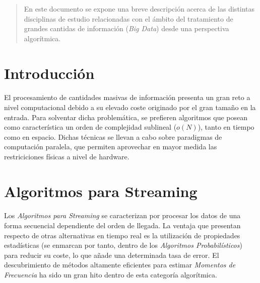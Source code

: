 \documentclass[a4paper]{article}
\begin{document}
  \maketitle %



  	\begin{abstract}
  		\noindent En este documento se expone una breve descripción acerca de las distintas disciplinas de estudio relacionadas con el ámbito del tratamiento de grandes cantidas de información (\emph{Big Data}) desde una perspectiva algorítmica.
  	\end{abstract}


  \section{Introducción}

    \paragraph{}
    El procesamiento de cantidades masivas de información presenta un gran reto a nivel computacional debido a su elevado coste originado por el gran tamaño en la entrada. Para solventar dicha problemática, se prefieren algoritmos que posean como característica un orden de complejidad sublineal ($o(N)$), tanto en tiempo como en espacio. Dichas técnicas se llevan a cabo sobre paradigmas de computación paralela, que permiten aprovechar en mayor medida las restriciciones físicas a nivel de hardware.

  \section{Algoritmos para Streaming}

    \paragraph{}
    Los \emph{Algoritmos para Streaming} se caracterizan por procesar los datos de una forma secuencial dependiente del orden de llegada. La ventaja que presentan respecto de otras alternativas en tiempo real es la utilización de propiedades estadísticas (se enmarcan por tanto, dentro de los \emph{Algoritmos Probabilísticos}) para reducir su coste, lo que añade una determinada tasa de error. El descubrimiento de métodos altamente eficientes para estimar \emph{Momentos de Frecuencia} ha sido un gran hito dentro de esta categoría algorítmica.
\end{document}
